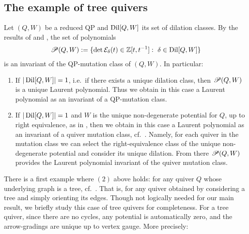 \subsection{The example of tree quivers}\label{ssec:tree_quivers} Let $(Q,W)$ be a reduced QP and $\operatorname{Dil}[Q,W]$ its set of dilation classes. By the results of  and , the set of polynomials
$$\mathscr{P}(Q,W):=\{\det\mathcal E_\delta(t)\in\mathbb Z[t,t^{-1}]:\mbox{ }\delta\in\operatorname{Dil}[Q,W]\}$$
is an invariant of the QP-mutation class of $(Q,W)$. In particular:\\

\begin{enumerate}
    \item If $|\operatorname{Dil}[Q,W]|=1$, i.e.~if there exists a unique dilation class, then $\mathscr{P}(Q,W)$ is a unique Laurent polynomial. Thus we obtain in this case a Laurent polynomial as an invariant of a QP-mutation class.\\

    \item If $|\operatorname{Dil}[Q,W]|=1$ and $W$ is the unique non-degenerate potential for $Q$, up to right equivalence, as in , then we obtain in this case a Laurent polynomial as an invariant of a quiver mutation class, cf.~. Namely, for each quiver in the mutation class we can select the right-equivalence class of the unique non-degenerate potential and consider its unique dilation. From there $\mathscr{P}(Q,W)$ provides the Laurent polynomial invariant of the quiver mutation class.\\
\end{enumerate}

\noindent There is a first example where $(2)$ above holds: for any quiver $Q$ whose underlying graph is a tree, cf.~\cite[Def.~1.6]{FominNeville}. That is, for any quiver obtained by considering a tree and simply orienting its edges. Though not logically needed for our main result, we briefly study this case of tree quivers for completeness. For a tree quiver, since there are no cycles, any potential is automatically zero, and the arrow-gradings are unique up to vertex gauge. More precisely:

